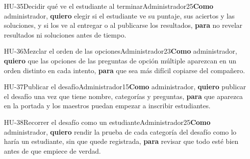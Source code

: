 \begin{historia}[1]{HU-35}{Decidir qué ve el estudiante al terminar}{Administrador}{2}{5}{\textbf{Como} administrador, \textbf{quiero} elegir si el estudiante ve su puntaje, sus aciertos y las soluciones, y si los ve al entregar o al publicarse los resultados, \textbf{para} no revelar resultados ni soluciones antes de tiempo.}
\end{historia}

\begin{historia}[1]{HU-36}{Mezclar el orden de las opciones}{Administrador}{2}{3}{\textbf{Como} administrador, \textbf{quiero} que las opciones de las preguntas de opción múltiple aparezcan en un orden distinto en cada intento, \textbf{para} que sea más difícil copiarse del compañero.}
\end{historia}

\begin{historia}[1]{HU-37}{Publicar el desafío}{Administrador}{1}{5}{\textbf{Como} administrador, \textbf{quiero} publicar el desafío una vez que tiene nombre, categorías y preguntas, \textbf{para} que aparezca en la portada y los maestros puedan empezar a inscribir estudiantes.}
\end{historia}

\begin{historia}[1]{HU-38}{Recorrer el desafío como un estudiante}{Administrador}{2}{5}{\textbf{Como} administrador, \textbf{quiero} rendir la prueba de cada categoría del desafío como lo haría un estudiante, sin que quede registrada, \textbf{para} revisar que todo esté bien antes de que empiece de verdad.}
\end{historia}

